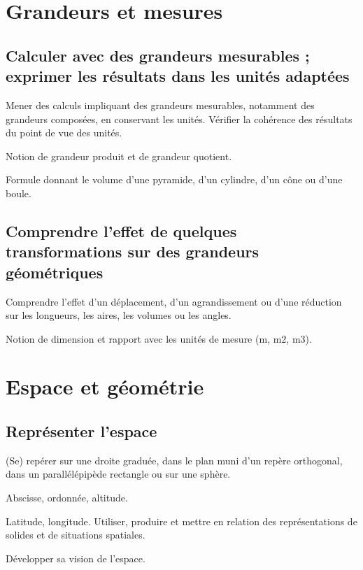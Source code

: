 \documentclass[11pt]{article}
\begin{document}
\section{Grandeurs et mesures}

\subsection{Calculer avec des grandeurs mesurables ; exprimer les résultats dans les unités adaptées}

\begin{todolist}
    \item Mener des calculs impliquant des grandeurs mesurables, notamment des grandeurs composées, en conservant les unités. Vérifier la cohérence des résultats du point de vue des unités.
    \item Notion de grandeur produit et de grandeur quotient.
    \item Formule donnant le volume d’une pyramide, d’un cylindre, d’un cône ou d’une boule.
\end{todolist}

\subsection{Comprendre l’effet de quelques transformations sur des grandeurs géométriques}

\begin{todolist}
    \item Comprendre l’effet d’un déplacement, d’un agrandissement ou d’une réduction sur les longueurs, les aires, les volumes ou les angles.
    \item Notion de dimension et rapport avec les unités de mesure (m, m2, m3).
\end{todolist}

\section{Espace et géométrie}

\subsection{Représenter l’espace}

\begin{todolist}
    \item (Se) repérer sur une droite graduée, dans le plan muni d’un repère orthogonal, dans un parallélépipède rectangle ou sur une sphère.
    \item Abscisse, ordonnée, altitude.
    \item Latitude, longitude. Utiliser, produire et mettre en relation des représentations de solides et de situations spatiales.
    \item Développer sa vision de l’espace.
\end{todolist}
\end{document}
